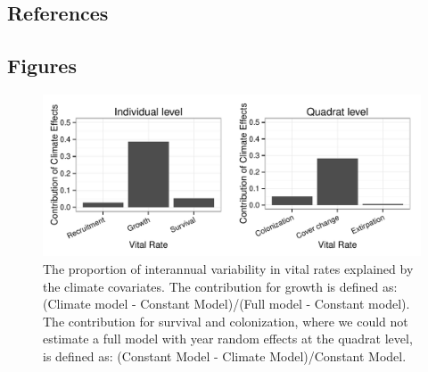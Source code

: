 \documentclass[12pt,]{article}
\begin{document}
\subsection{References}\label{references}

\subsection{Figures}\label{figures}

\begin{figure}[htbp]
\centering
\includegraphics{components/figure/manuscript-figure_1.pdf}
\caption{The proportion of interannual variability in vital rates
explained by the climate covariates. The contribution for growth is
defined as: (Climate model - Constant Model)/(Full model - Constant
model). The contribution for survival and colonization, where we could
not estimate a full model with year random effects at the quadrat level,
is defined as: (Constant Model - Climate Model)/Constant Model.}
\end{figure}
\end{document}
